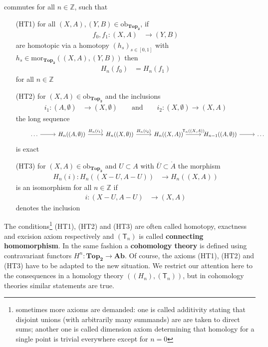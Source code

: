 commutes for all $n \in \mathbb{Z}$, such that
\begin{enumerate}
\item[(HT1)]
for all $(X,A),(Y,B) \in \mathrm{ob}_{\mathbf{Top_{2}}}$, if
\begin{align*}
  f_{0},f_{1}
  \colon
  (X,A)
  &\to
  (Y,B)
\end{align*}
are homotopic via a homotopy $(h_{s})_{s\in[0,1]}$ with $h_{s} \in \mathrm{mor}_{\mathbf{Top_{2}}}((X,A),(Y,B))$ then
\begin{align*}
  H_{n}(f_{0})
  &=
  H_{n}(f_{1})
\end{align*}
for all $n \in \mathbb{Z}$ 

\item[(HT2)]
for $(X,A) \in \mathrm{ob}_{\mathbf{Top_{2}}}$ and the inclusions
\begin{align*}
  i_{1}
  \colon
  (A,\emptyset)
  &\to
  (X,\emptyset)
  \qquad
  \text{and}
  \qquad
  i_{2}
  \colon
  (X,\emptyset)
  \to
  (X,A)
\end{align*}
the long sequence
\begin{equation*}
\hspace{+2em}
\begin{tikzcd}[row sep=2.2em,column sep=2.6em]
  \ldots
  \ar{r}
  &
  H_{n}((A,\emptyset))
  \ar{r}{H_{n}(i_{1})}
  &
  H_{n}((X,\emptyset))
  \ar{r}{H_{n}(i_{2})}
  &
  H_{n}((X,A))
  \ar{r}{\mathsf{T}_{n}((X,A))}
  &
  H_{n-1}((A,\emptyset))
  \ar{r}
  &
  \ldots
\end{tikzcd}
\end{equation*}
is exact

\item[(HT3)]
for $(X,A) \in \mathrm{ob}_{\mathbf{Top_{2}}}$ and $U \subset A$ with $\overline{U} \subset \mathring{A}$ the morphism
\begin{align*}
  H_{n}(i)
  \colon
  H_{n}((X-U,A-U))
  &\to
  H_{n}((X,A))
\end{align*}
is an isomorphism for all $n \in \mathbb{Z}$ if
\begin{align*}
  i
  \colon
  (X-U,A-U)
  &\to
  (X,A)
\end{align*}
denotes the inclusion
\end{enumerate}
The conditions\footnote{sometimes more axioms are demanded: one is called additivity stating that disjoint unions (with arbitrarily many summands) are are taken to direct sums; another one is called dimension axiom determining that homology for a single point is trivial everywhere except for $n=0$} (HT1), (HT2) and (HT3) are often called homotopy, exactness and excision axiom respectively and $(\mathsf{T}_{n})$ is called \textbf{connecting homomorphism}. In the same fashion a \textbf{cohomology theory} is defined using contravariant functors $H^{n} \colon \mathbf{Top_{2}} \to \mathbf{Ab}$. Of course, the axioms (HT1), (HT2) and (HT3) have to be adapted to the new situation. We restrict our attention here to the consequences in a homology theory $((H_{n}),(\mathsf{T}_{n}))$, but in cohomology theories similar statements are true.
